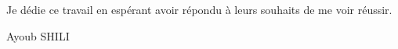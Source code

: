 \begin{center}
    \endgroup
    \begingroup
    
    
    
    Je dédie ce travail en espérant avoir répondu à leurs souhaits de me voir réussir.
     \vspace{4mm}
    \endgroup
    
    
    
    
    
     
    
    
    \vspace{8mm}
    \begin{flushright}
        \LARGE Ayoub SHILI
    \end{flushright}
    \end{center}